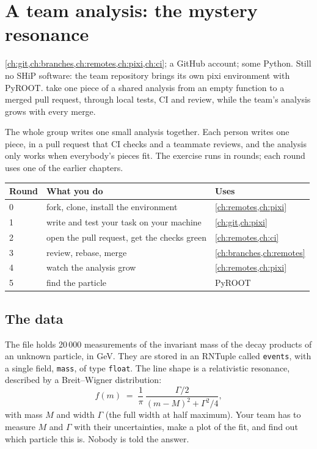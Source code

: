 \chapter{A team analysis: the mystery resonance}
\label{ch:team}

{\cref{ch:git,ch:branches,ch:remotes,ch:pixi,ch:ci}; a GitHub account; some
Python. Still no SHiP software: the team repository brings its own pixi
environment with PyROOT.}
{take one piece of a shared analysis from an empty function to a merged pull
request, through local tests, CI and review, while the team's analysis grows
with every merge.}

The whole group writes one small analysis together. Each person writes one
piece, in a pull request that CI checks and a teammate reviews, and the
analysis only works when everybody's pieces fit. The exercise runs in rounds;
each round uses one of the earlier chapters.

\begin{center}\small
\begin{tabular}{l l l}
\toprule
Round & What you do & Uses \\
\midrule
0 & fork, clone, install the environment & \cref{ch:remotes,ch:pixi} \\
1 & write and test your task on your machine & \cref{ch:git,ch:pixi} \\
2 & open the pull request, get the checks green & \cref{ch:remotes,ch:ci} \\
3 & review, rebase, merge & \cref{ch:branches,ch:remotes} \\
4 & watch the analysis grow & \cref{ch:remotes,ch:pixi} \\
5 & find the particle & PyROOT \\
\bottomrule
\end{tabular}
\end{center}

\section{The data}

The file  holds 20\,000 measurements of the invariant mass
of the decay products of an unknown particle, in GeV. They are stored in an
RNTuple called \texttt{events}, with a single field, \texttt{mass}, of type
\texttt{float}. The line shape is a relativistic resonance, described by a
Breit--Wigner distribution:
\[
  f(m) \;=\; \frac{1}{\pi}\,\frac{\Gamma/2}{(m-M)^2 + \Gamma^2/4},
\]
with mass $M$ and width $\Gamma$ (the full width at half maximum). Your team
has to measure $M$ and $\Gamma$ with their uncertainties, make a plot of the
fit, and find out which particle this is. Nobody is told the answer.

